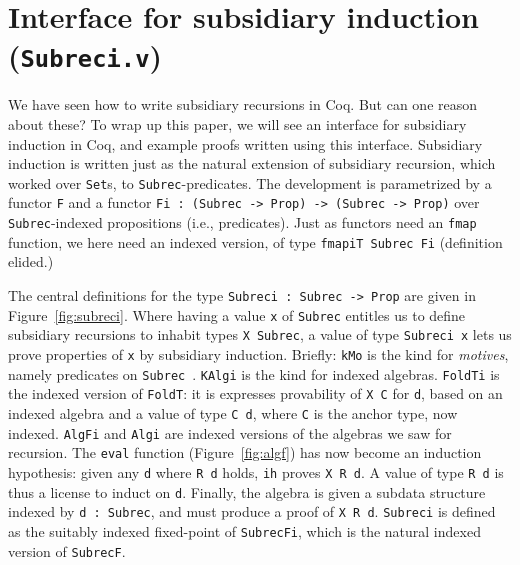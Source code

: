 \documentclass[a4paper,USenglish]{lipics-v2021}
\begin{document}
\section{Interface for subsidiary induction (\texttt{Subreci.v})}
\label{sec:interfacei}

We have seen how to write subsidiary recursions in Coq.  But can one
reason about these?  To wrap up this paper, we will see an interface
for subsidiary induction in Coq, and example proofs written using this
interface.  Subsidiary induction is written just as the natural
extension of subsidiary recursion, which worked over \verb|Set|s, to
\verb|Subrec|-predicates.  The development is parametrized by a
functor \verb|F| and a functor
\verb|Fi : (Subrec -> Prop) -> (Subrec -> Prop)| over
\verb|Subrec|-indexed propositions (i.e., predicates).  Just as
functors need an \verb|fmap| function, we here need an indexed
version, of type \verb|fmapiT Subrec Fi| (definition elided.)

The central definitions for the type \verb|Subreci : Subrec -> Prop|
are given in Figure~\ref{fig:subreci}.  Where having a value \verb|x|
of \verb|Subrec| entitles us to define subsidiary recursions to
inhabit types \verb|X Subrec|, a value of type \verb|Subreci x| lets
us prove properties of \verb|x| by subsidiary induction.  Briefly:
\verb|kMo| is the kind for \emph{motives}, namely predicates on
\verb|Subrec|~\cite{mcbride00}.  \verb|KAlgi| is the kind for indexed
algebras.  \verb|FoldTi| is the indexed version of \verb|FoldT|: it is
expresses provability of \verb|X C| for \verb|d|, based on an indexed
algebra and a value of type \verb|C d|, where \verb|C| is the anchor
type, now indexed.  \verb|AlgFi| and \verb|Algi| are indexed versions
of the algebras we saw for recursion.  The \verb|eval| function
(Figure~\ref{fig:algf}) has now become an induction hypothesis: given
any \verb|d| where \verb|R d| holds, \verb|ih| proves \verb|X R d|.  A
value of type \verb|R d| is thus a license to induct on \verb|d|.
Finally, the algebra is given a subdata structure indexed by
\verb|d : Subrec|, and must produce a proof of \verb|X R d|.  \verb|Subreci|
is defined as the suitably indexed fixed-point of \verb|SubrecFi|, which
is the natural indexed version of \verb|SubrecF|.
\end{document}
